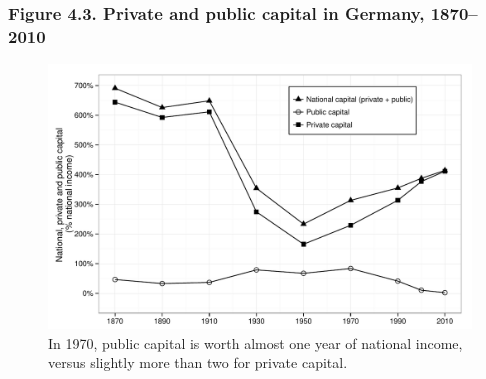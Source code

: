 \documentclass[t]{beamer}\usepackage[]{graphicx}\usepackage[]{color}
\newenvironment{knitrout}{}{} %
\begin{document}
\begin{frame}[label=Figure_4_3]
\frametitle{Figure 4.3. Private and public capital in Germany, 1870--2010}
\begin{figure}[t]
\begin{minipage}[b]{\textwidth}
\centering
\begin{knitrout}\footnotesize
{}\color{fgcolor}

{\centering \includegraphics[width=1\linewidth]{figures/bw/Figure_4_3} 

}



\end{knitrout}
\caption{In 1970, public capital is worth almost one year of national income, versus slightly more than two for private capital.}
\end{minipage}
\end{figure}
\end{frame}
\end{document}

